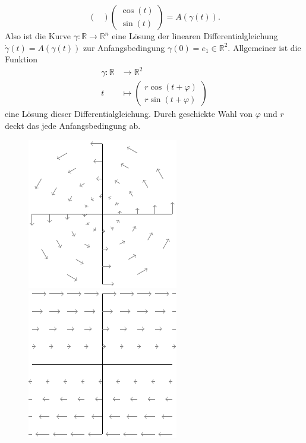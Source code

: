 \documentclass[../main.tex]{subfiles}
\begin{document}
\begin{examples}
\begin{enumerate}[(1)]
\[\begin{pmatrix}
        \end{pmatrix}
        \begin{pmatrix}
          \cos(t) \\ \sin(t)
        \end{pmatrix}
        = A(\gamma(t)).
      \]
      Also ist die Kurve $\gamma \colon \mathbb{R} \to \mathbb{R}^n$ 
      eine Lösung der linearen Differentialgleichung
      $\dot \gamma(t) = A(\gamma(t))$ 
      zur Anfangsbedingung $\gamma(0) = e_1 \in \mathbb{R}^2$.
      Allgemeiner ist die Funktion
      \begin{align*}
        \gamma \colon \mathbb{R} & \to \mathbb{R}^2 \\
        t & \mapsto 
        \begin{pmatrix}
          r \cos(t + \varphi) \\
          r \sin(t + \varphi)
        \end{pmatrix}
      \end{align*}
      eine Lösung dieser Differentialgleichung.
      Durch geschickte Wahl von $\varphi$ und $r$
      deckt das jede Anfangsbedingung ab.
      \begin{figure}[htb] 
        \centering
        \begin{minipage}{0.50\textwidth}
          \centering
          \includegraphics{figures/rotationfield}
        \end{minipage}%
        \begin{minipage}{0.50\textwidth}
          \centering
          \includegraphics{figures/yzero}

\end{minipage}
\end{figure}
\end{enumerate}
\end{examples}
\end{document}
